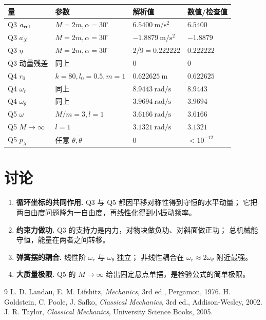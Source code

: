 \documentclass[UTF8,a4paper,11pt]{ctexart}
\begin{document}
\begin{center}
\small
\begin{tabular}{llll}
\toprule
量 & 参数 & 解析值 & 数值/检查值 \\
\midrule
Q3 $a_{\rm rel}$ & $M=2m,\alpha=30^\circ$ & $6.5400\ \mathrm{m/s^2}$ & $6.5400$ \\
Q3 $a_X$ & $M=2m,\alpha=30^\circ$ & $-1.8879\ \mathrm{m/s^2}$ & $-1.8879$ \\
Q3 $\eta$ & $M=2m,\alpha=30^\circ$ & $2/9=0.222222$ & $0.222222$ \\
Q3 动量残差 & 同上 & 0 & $0$ \\
Q4 $r_0$ & $k=80,l_0=0.5,m=1$ & $0.622625\ \mathrm{m}$ & $0.622625$ \\
Q4 $\omega_r$ & 同上 & $8.9443\ \mathrm{rad/s}$ & $8.9443$ \\
Q4 $\omega_\theta$ & 同上 & $3.9694\ \mathrm{rad/s}$ & $3.9694$ \\
Q5 $\omega$ & $M/m=3,l=1$ & $3.6166\ \mathrm{rad/s}$ & $3.6166$ \\
Q5 $M\to\infty$ & $l=1$ & $3.1321\ \mathrm{rad/s}$ & $3.1321$ \\
Q5 $p_X$ & 任意 $\theta,\dot\theta$ & 0 & $<10^{-12}$ \\
\bottomrule
\end{tabular}
\end{center}

\section{讨论}

\begin{enumerate}
  \item \textbf{循环坐标的共同作用.} Q3 与 Q5 都因平移对称性得到守恒的水平动量；
        它把两自由度问题降为一自由度，再线性化得到小振动频率。
  \item \textbf{约束力做功.} Q3 的支持力是内力，对物块做负功、对斜面做正功；
        总机械能守恒，能量在两者之间转移。
  \item \textbf{弹簧摆的耦合.} 线性阶 $\omega_r$ 与 $\omega_\theta$ 独立；
        非线性耦合在 $\omega_r\approx2\omega_\theta$ 附近最强。
  \item \textbf{大质量极限.} Q5 的 $M\to\infty$ 给出固定悬点单摆，是检验公式的简单极限。
\end{enumerate}

\begin{thebibliography}{9}
 L. D. Landau, E. M. Lifshitz, \emph{Mechanics}, 3rd ed., Pergamon, 1976.
 H. Goldstein, C. Poole, J. Safko, \emph{Classical Mechanics}, 3rd ed., Addison-Wesley, 2002.
 J. R. Taylor, \emph{Classical Mechanics}, University Science Books, 2005.
\end{thebibliography}
\end{document}
